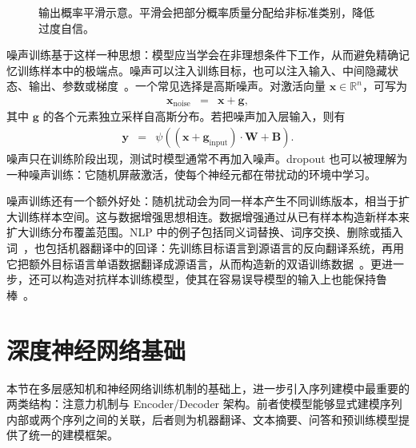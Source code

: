 
\begin{figure}[htbp]
  \centering
  
  \caption{输出概率平滑示意。平滑会把部分概率质量分配给非标准类别，降低过度自信。}
  \label{fig:nlpbook-smoothing-interpolation}
\end{figure}

噪声训练基于这样一种思想：模型应当学会在非理想条件下工作，从而避免精确记忆训练样本中的极端点。噪声可以注入训练目标，也可以注入输入、中间隐藏状态、输出、参数或梯度~\cite{plaut-etal:1986experiments,Holmstrom-Koistinen:1992noise,bishop:1995training,graves-etal:2013speech,neelakantan-etal:2015adding}。一个常见选择是高斯噪声。对激活向量 $\mathbf{x}\in\mathbb{R}^n$，可写为
\begin{eqnarray}
\mathbf{x}_{\mathrm{noise}}
& = &
\mathbf{x}+\mathbf{g},
\end{eqnarray}
\noindent 其中 $\mathbf{g}$ 的各个元素独立采样自高斯分布。若把噪声加入层输入，则有
\begin{eqnarray}
\mathbf{y}
& = &
\psi((\mathbf{x}+\mathbf{g}_{\mathrm{input}})\cdot\mathbf{W}+\mathbf{B}).
\end{eqnarray}
噪声只在训练阶段出现，测试时模型通常不再加入噪声。dropout 也可以被理解为一种噪声训练：它随机屏蔽激活，使每个神经元都在带扰动的环境中学习。

噪声训练还有一个额外好处：随机扰动会为同一样本产生不同训练版本，相当于扩大训练样本空间。这与数据增强思想相连。数据增强通过从已有样本构造新样本来扩大训练分布覆盖范围。NLP 中的例子包括同义词替换、词序交换、删除或插入词~\cite{feng-etal:2021survey,shorten-Khoshgoftaar:2019survey}，也包括机器翻译中的回译：先训练目标语言到源语言的反向翻译系统，再用它把额外目标语言单语数据翻译成源语言，从而构造新的双语训练数据~\cite{sennrich-etal:2016improving}。更进一步，还可以构造对抗样本训练模型，使其在容易误导模型的输入上也能保持鲁棒~\cite{Szegedy-etal:2014neural,Goodfellow-etal:2015Adversarial}。

\section{深度神经网络基础}

本节在多层感知机和神经网络训练机制的基础上，进一步引入序列建模中最重要的两类结构：注意力机制与 Encoder/Decoder 架构。前者使模型能够显式建模序列内部或两个序列之间的关联，后者则为机器翻译、文本摘要、问答和预训练模型提供了统一的建模框架。

